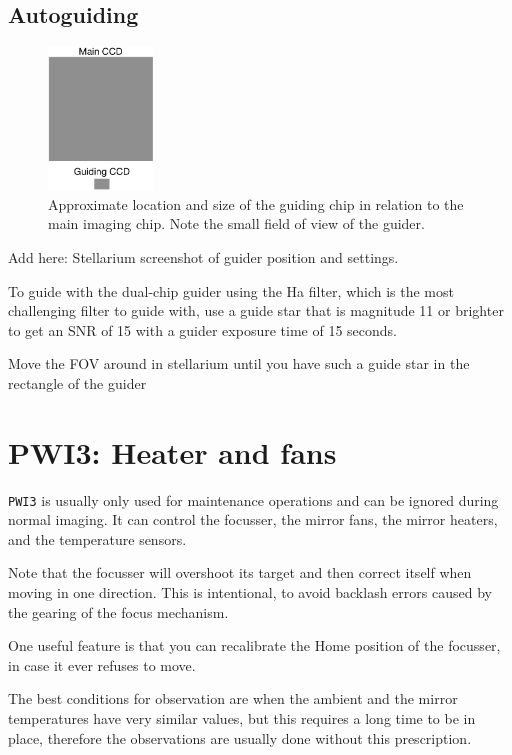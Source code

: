 \documentclass[a4paper, 11pt, fleqn]{memoir}
\begin{document}
\subsection{Autoguiding}

\begin{figure}
    \centering
    \includegraphics[width=0.25\textwidth]{guiding-chip-position}
    \caption{Approximate location and size of the guiding chip in relation to the main imaging chip.
        Note the small field of view of the guider.
    }
    \label{finder}
\end{figure}

Add here: Stellarium screenshot of guider position and settings.

To guide with the dual-chip guider using the Ha filter, which is the most challenging filter to guide with, use a guide star that is magnitude 11 or brighter to get an SNR of 15 with a guider exposure time of 15 seconds.

Move the FOV around in stellarium until you have such a guide star in the rectangle of the guider

\section{PWI3: Heater and fans}
\texttt{PWI3} is usually only used for maintenance operations and can be ignored during normal imaging.
It can control the focusser, the mirror fans, the mirror heaters, and the temperature sensors.

Note that the focusser will overshoot its target and then correct itself when moving in one direction.
This is intentional, to avoid backlash errors caused by the gearing of the focus mechanism.

One useful feature is that you can recalibrate the Home position of the focusser, in case it ever refuses to move.

The best conditions for observation are when the ambient and the mirror temperatures have very similar values, but this requires a long time to be in place, therefore the observations are usually done without this prescription.
\end{document}
